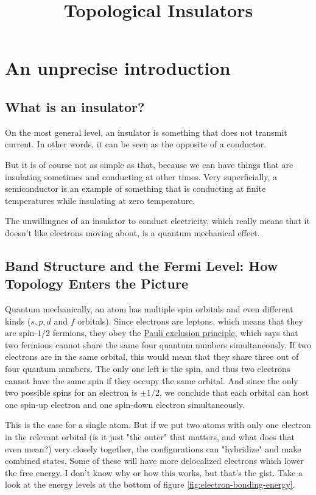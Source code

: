 \documentclass[a4paper]{article}
\title{Topological Insulators}
\begin{document}
    \maketitle
    \tableofcontents
    \newpage

    \section{An unprecise introduction}
    \subsection{What is an insulator?}
    On the most general level, an insulator is something that does not transmit current. In other words, it can be seen as the opposite of a conductor.
    
    But it is of course not as simple as that, because we can have things that are insulating sometimes and conducting at other times. Very superficially, a semiconductor is an example of something that is conducting at finite temperatures while insulating at zero temperature.

    The unwillingnes of an insulator to conduct electricity, which really means that it doesn't like electrons moving about, is a quantum mechanical effect. 

    \subsection{Band Structure and the Fermi Level: How Topology Enters the Picture}
    Quantum mechanically, an atom has multiple spin orbitals and even different kinds (\(s, p, d\) and \(f\) orbitals). Since electrons are leptons, which means that they are spin-\(1/2\) fermions, they obey the \href{https://en.wikipedia.org/wiki/Pauli_exclusion_principle}{Pauli exclusion principle}, which says that two fermions cannot share the same four quantum numbers simultaneously. If two electrons are in the same orbital, this would mean that they share three out of four quantum numbers. The only one left is the spin, and thus two electrons cannot have the same spin if they occupy the same orbital. And since the only two possible spins for an electron is \(\pm 1 / 2\), we conclude that each orbital can host one spin-up electron and one spin-down electron simultaneously.

    This is the case for a single atom. But if we put two atoms with only one electron in the relevant orbital (is it just "the outer" that matters, and what does that even mean?) very closely together, the configurations can "hybridize" and make combined states. Some of these will have more delocalized electrons which lower the free energy. I don't know why or how this works, but that's the gist. Take a look at the energy levels at the bottom of figure \ref{fig:electron-bonding-energy}.
\end{document}
